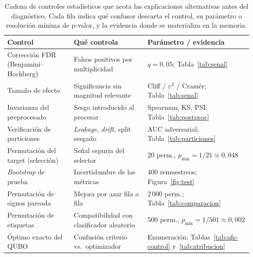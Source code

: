 \begin{table}[!htbp]
  \centering
  \caption[Cadena de controles estadísticos]{Cadena de controles estadísticos que acota las explicaciones alternativas antes del
    diagnóstico. Cada fila indica qué confusor descarta el control, su
    parámetro o resolución mínima de p-valor, y la evidencia donde se
    materializa en la memoria.}
  \label{tab:cadena-tests}
  \small
  \begin{tabular}{p{}p{}p{}}
    \toprule
    Control & Qué controla & Parámetro / evidencia \\
    \midrule
    Corrección FDR (Benjamini--Hochberg) & Falsos positivos por
    multiplicidad & $q=0{,}05$; Tabla~\ref{tab:senal} \\
    Tamaño de efecto & Significancia sin magnitud relevante & Cliff /
    $\varepsilon^2$ / Cramér; Tabla~\ref{tab:senal} \\
    Invarianza del preprocesado & Sesgo introducido al procesar &
    Spearman, KS, PSI; Tabla~\ref{tab:postproc} \\
    Verificación de particiones & \textit{Leakage}, \textit{drift}, split
    sesgado & AUC adversarial; Tabla~\ref{tab:particiones} \\
    Permutación del target (selección) & Señal espuria del selector &
    20 perm., $p_{\min}=1/21\approx0{,}048$ \\
    \textit{Bootstrap} de prueba & Incertidumbre de las métricas &
    400 remuestreos; Figura~\ref{fig:test} \\
    Permutación de signos pareada & Mejora por azar fila a fila &
    2\,000 perm.; Tabla~\ref{tab:comparacion} \\
    Permutación de etiquetas & Compatibilidad con clasificador aleatorio &
    500 perm., $p_{\min}=1/501\approx0{,}002$ \\
    Óptimo exacto del QUBO & Confusión criterio vs.\ optimizador &
    Enumeración; Tablas~\ref{tab:qfs-control} y~\ref{tab:atribucion} \\
    \bottomrule
  \end{tabular}
\end{table}
\FloatBarrier

